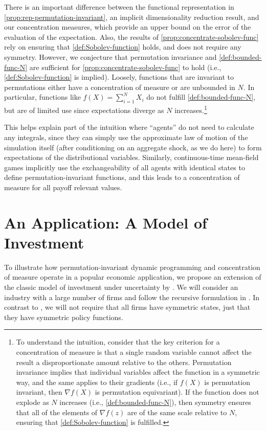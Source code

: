\documentclass[12pt]{article}
\begin{document}
There is an important difference between the functional representation in \cref{prop:rep-permutation-invariant}, an implicit dimensionality reduction result, and our concentration measures, which provide an upper bound on the error of the evaluation of the expectation. Also, the results of \cref{prop:concentrate-sobolev-func} rely on ensuring that \cref{def:Sobolev-function} holds, and does not require any symmetry.  However, we conjecture that permutation invariance and \cref{def:bounded-func-N} are sufficient for \cref{prop:concentrate-sobolev-func} to hold (i.e., \cref{def:Sobolev-function} is implied). Loosely, functions that are invariant to permutations either have a concentration of measure or are unbounded in $N$. In particular, functions like $f(X) = \sum_{i=1}^N X_i$ do not fulfill \cref{def:bounded-func-N}, but are of limited use since expectations diverge as $N$ increases.\footnote{To understand the intuition, consider that the key criterion for a concentration of measure is that a single random variable cannot affect the result a disproportionate amount relative to the others. Permutation invariance implies that individual variables affect the function in a symmetric way, and the same applies to their gradients (i.e., if $f(X)$ is permutation invariant, then $\nabla f(X)$ is permutation equivariant). If the function does not explode as $N$ increases (i.e., \cref{def:bounded-func-N}), then symmetry ensures that all of the elements of $\nabla f(z)$ are of the same scale relative to $N$, ensuring that \cref{def:Sobolev-function} is fulfilled.}

This helps explain part of the \citet{krusell1998income} intuition where ``agents'' do not need to calculate any integrals, since they can simply use the approximate law of motion of the simulation itself (after conditioning on an aggregate shock, as we do here) to form expectations of the distributional variables.  Similarly, continuous-time mean-field games \citep{KaplanMollViolante2018} implicitly use the exchangeability of all agents with identical states to define permutation-invariant functions, and this leads to a concentration of measure for all payoff relevant values.

\section{An Application: A Model of Investment}\label{sec:Application}
	
To illustrate how permutation-invariant dynamic programming and concentration of measure operate in a popular economic application, we propose an extension of the classic model of investment under uncertainty by \citet{LucasPrescott1971}. We will consider an industry with a large number of firms and follow the recursive formulation in \citet{PrescottMehra1980}. In contrast to \citet{LucasPrescott1971}, we will not require that all firms have symmetric states, just that they have symmetric policy functions. 
\end{document}
